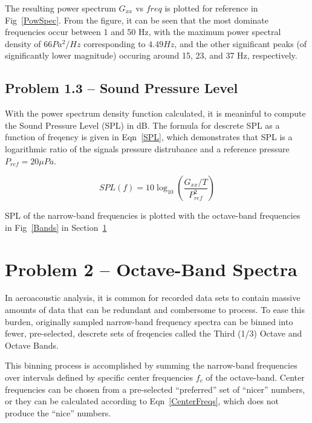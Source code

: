 \documentclass[twocolumn,10pt]{asme2ej}
\begin{document}
The resulting power spectrum $G_{xx}$ vs $freq$ is plotted for reference in Fig~\ref{PowSpec}.  From the figure, it can be seen that the most dominate frequencies occur between 1 and 50 Hz, with the maximum power spectral density of $66 Pa^2\text{/}Hz$ corresponding to $4.49Hz$, and the other significant peaks (of significantly lower magnitude) occuring around 15, 23, and 37 Hz, respectively.

\subsection{Problem 1.3 -- Sound Pressure Level}

With the power spectrum density function calculated, it is meaninful to compute the Sound Pressure Level (SPL) in dB.  The formula for descrete SPL as a function of freqency is given in Eqn~\ref{SPL}, which demonstrates that SPL is a logarithmic ratio of the signal\textquotesingle s pressure distrubance and a reference pressure $P_{ref}=20\mu Pa$.

\begin{equation} \label{SPL}
SPL(f) = 10\log_{10}\left( \dfrac{G_{xx} / T}{P_{ref}^2} \right)
\end{equation}

\noindent SPL of the narrow-band frequencies is plotted with the octave-band frequencies in Fig~\ref{Bands} in Section~\ref{sect_oct}


\section{Problem 2 -- Octave-Band Spectra} \label{sect_oct}

In aeroacoustic analysis, it is common for recorded data sets to contain massive amounts of data that can be redundant and combersome to process.  To ease this burden, originally sampled narrow-band frequency spectra can be binned into fewer, pre-selected, descrete sets of freqencies called the Third (1/3) Octave and Octave Bands.

This binning process is accomplished by summing the narrow-band frequencies over intervals defined by specific center frequencies $f_c$ of the octave-band.  Center frequencies can be chosen from a pre-selected ``preferred'' set of ``nicer'' numbers, or they can be calculated according to Eqn~\ref{CenterFreqs}, which does not produce the ``nice'' numbers.
\end{document}
